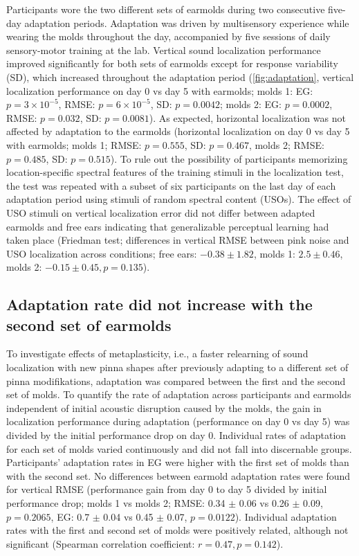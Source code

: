 Participants wore the two different sets of earmolds during two consecutive five-day adaptation periods. Adaptation was driven by multisensory experience while wearing the molds throughout the day, accompanied by five sessions of daily sensory-motor training at the lab. Vertical sound localization performance improved significantly for both sets of earmolds except for response variability (SD), which increased throughout the adaptation period (\cref{fig:adaptation}, vertical localization performance on day 0 vs day 5 with earmolds; molds 1: EG: $p = 3 \times 10^{-5}$, RMSE: $p = 6 \times 10^{-5}$, SD: $p = 0.0042$; molds 2: EG: $p = 0.0002$, RMSE: $p = 0.032$, SD: $p = 0.0081$). As expected, horizontal localization was not affected by adaptation to the earmolds (horizontal localization on day 0 vs day 5 with earmolds; molds 1; RMSE: $p = 0.555$, SD: $p = 0.467$, molds 2; RMSE: $p = 0.485$, SD: $p = 0.515$). %
To rule out the possibility of participants memorizing location-specific spectral features of the training stimuli in the localization test, the test was repeated with a subset of six participants on the last day of each adaptation period using stimuli of random spectral content (USOs). The effect of USO stimuli on vertical localization error did not differ between adapted earmolds and free ears indicating that generalizable perceptual learning had taken place (Friedman test; differences in vertical RMSE between pink noise and USO localization across conditions; free ears: $-0.38 \pm 1.82$, molds 1: $2.5 \pm 0.46$, molds 2: $-0.15 \pm 0.45, p = 0.135$).

\subsection{Adaptation rate did not increase with the second set of earmolds}

To investigate effects of metaplasticity, i.e., a faster relearning of sound localization with new pinna shapes after previously adapting to a different set of pinna modifikations, adaptation was compared between the first and the second set of molds. To quantify the rate of adaptation across participants and earmolds independent of initial acoustic disruption caused by the molds, the gain in localization performance during adaptation (performance on day 0 vs day 5) was divided by the initial performance drop on day 0. Individual rates of adaptation for each set of molds varied continuously and did not fall into discernable groups. Participants' adaptation rates in EG were higher with the first set of molds than with the second set. No differences between earmold adaptation rates were found for vertical RMSE (performance gain from day 0 to day 5 divided by initial performance drop; molds 1 vs molds 2; RMSE: 0.34 $\pm$ 0.06 vs 0.26 $\pm$ 0.09, $p = 0.2065$, EG: 0.7 $\pm$ 0.04 vs 0.45 $\pm$ 0.07, $p = 0.0122$). Individual adaptation rates with the first and second set of molds were positively related, although not significant (Spearman correlation coefficient: $r = 0.47, p = 0.142$). 

